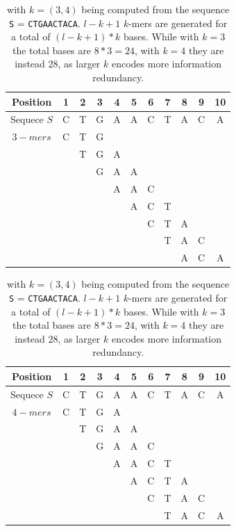 \begin{table}[h!]
\begin{center}

	\begin{tabular}{ c c c c c c c c c c c}
		\toprule
		Position & 1 & 2 & 3 & 4 & 5 & 6 & 7 & 8 & 9 & 10 \\
		\midrule
		Sequece $S$ & C & T & G & A & A & C & T &A & C & A\\
		\midrule 
		$3-mers$ & C & T & G  \\
		&   & T & G & A \\
		&   &  & G & A & A \\
		&   &  &  & A & A & C\\
		&   &  &  &  & A & C & T\\
		&   &  &  &  &  & C & T & A \\
		&   &  &  &  &  &  & T & A & C \\
		&   &  &  &  &  & & & A & C & A\\
		
		\hline
	\end{tabular}

	\vspace*{0.3 cm}

	\centering
	\begin{tabular}{ c c c c c c c c c c c}
	\toprule
	Position & 1 & 2 & 3 & 4 & 5 & 6 & 7 & 8 & 9 & 10 \\
	\midrule
	Sequece $S$ & C & T & G & A & A & C & T &A & C & A\\
	\midrule 
	$4-mers$ & C & T & G & A \\
	&   & T & G & A & A\\
	&   &  & G & A & A & C\\
	&   &  &  & A & A & C & T\\
	&   &  &  &  & A & C & T & A\\
	&   &  &  &  &  & C & T & A & C\\
	&   &  &  &  &  &  & T & A & C & A\\

	
	\bottomrule
\end{tabular}
	\caption[\kmer computation from a sequence]{\kmers with $k=(3,4)$ being computed from the sequence \texttt{S} = \texttt{CTGAACTACA}. $l-k +1$ $k$-mers are generated for a total of $(l -k + 1) * k$ bases. While with $k=3$ the total bases are $ 8 * 3 = 24$, with $k=4$ they are instead $28$, as larger $k$ encodes more information redundancy.}
	\label{tab-kmers}
\end{center}
\end{table}


